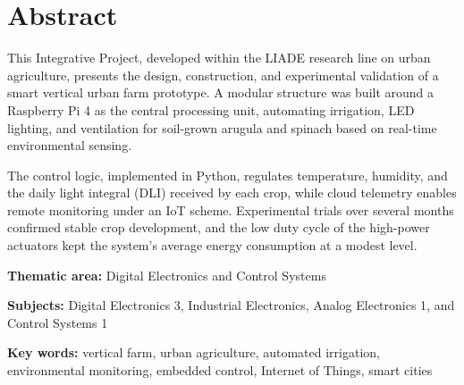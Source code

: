 \section*{Abstract}

This Integrative Project, developed within the LIADE research line on urban agriculture, presents the design, construction, and experimental validation of a smart vertical urban farm prototype. A modular structure was built around a Raspberry Pi 4 as the central processing unit, automating irrigation, LED lighting, and ventilation for soil-grown arugula and spinach based on real-time environmental sensing.

The control logic, implemented in Python, regulates temperature, humidity, and the daily light integral (DLI) received by each crop, while cloud telemetry enables remote monitoring under an IoT scheme. Experimental trials over several months confirmed stable crop development, and the low duty cycle of the high-power actuators kept the system's average energy consumption at a modest level.

\vspace{0.8cm}

\noindent\textbf{Thematic area:} Digital Electronics and Control Systems

\vspace{0.4cm}

\noindent\textbf{Subjects:} Digital Electronics 3, Industrial Electronics, Analog Electronics 1, and Control Systems 1

\vspace{0.4cm}

\noindent\textbf{Key words:} vertical farm, urban agriculture, automated irrigation, environmental monitoring, embedded control, Internet of Things, smart cities